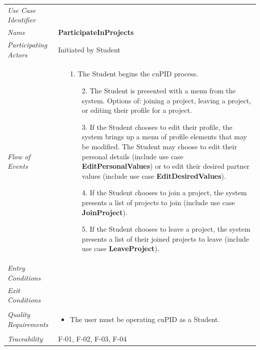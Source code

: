 \documentclass[12pt,letterpaper]{article}
\begin{document}
\begin{center}
	\begin{tabu} to 
		\toprule
		Use Case Identifier & \participateinprojects{} \\
		Name & {\bf ParticipateInProjects} \\
		Participating Actors & Initiated by Student \\

		Flow of Events & 
	    \begin{enumerate}[topsep=-1em]
		    \item[1.] The Student begins the cuPID process.
			\begin{enumerate}
				\item[2.] The Student is presented with a menu from the system. Options of: joining a project, leaving a project, or editing their profile for a project.
				\item[3.] If the Student chooses to edit their profile, the system brings up a menu of profile elements that may be modified. The Student may choose to edit their personal details (include use case \textbf{EditPersonalValues}) or to edit their desired partner values (include use case \textbf{EditDesiredValues}).
				\item[4.] If the Student chooses to join a project, the system presents a list of projects to join (include use case \textbf{JoinProject}).
				\item[5.] If the Student chooses to leave a project, the system presents a list of their joined projects to leave (include use case \textbf{LeaveProject}).
			\end{enumerate}
		\end{enumerate} \\

		Entry Conditions & \\

		Exit Conditions & \\ %

		Quality Requirements &
		\begin{itemize}[topsep=-1em]
			\item The user must be operating cuPID as a Student.
		\end{itemize} \\

		Traceability & F-01, F-02, F-03, F-04\\

		\toprule
	\end{tabu}
\end{center}
\end{document}

